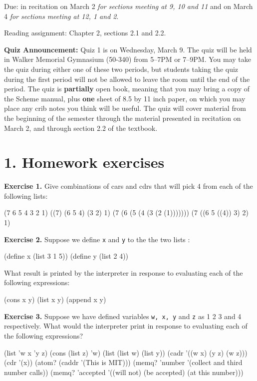 \vpar
Due: in recitation on March 2 {\it for sections meeting at 9, 10 and
11} and on March 4 {\it for sections meeting at 12, 1 and 2}.


\vpar
Reading assignment: Chapter 2, sections 2.1 and 2.2.

\vskip 20pt

{\bf Quiz Announcement:}  Quiz 1 is on Wednesday, March 9.  The quiz
will be held in Walker Memorial Gymnasium (50-340) from 5--7PM or
7--9PM.  You may take the quiz during either one of these two periods,
but students taking the quiz during the first period will not be allowed
to leave the room until the end of the period.  The quiz is {\bf
partially} open book, meaning that you may bring a copy of the Scheme
manual, plus {\bf one} sheet of 8.5 by 11 inch paper, on which you may
place any crib notes you think will be useful.  The quiz will cover
material from the beginning of the semester through the material
presented in recitation on March 2, and through section 2.2 
of the textbook.  

\chapter{1. Homework exercises}


\vpar
{\bf Exercise 1.}
Give combinations of cars and cdrs that will pick 4 from each of
the following lists:

\beginlisp
(7 6 5 4 3 2 1)
((7) (6 5 4) (3 2) 1)
(7 (6 (5 (4 (3 (2 (1)))))))
(7 ((6 5 ((4)) 3) 2) 1)
\endlisp

\vpar
{\bf Exercise 2.}
Suppose we define {\tt x} and {\tt y} to the the two lists :

\beginlisp
(define x (list 3 1 5))
(define y (list 2 4))
\endlisp

\noindent What result is printed by the interpreter in response to
evaluating each of the following expressions:

\beginlisp
(cons x y)
(list x y)
(append x y)
\endlisp

\vpar
{\bf Exercise 3.}
Suppose we have defined variables {\tt w, x, y} and {\tt z} as 1 2 3 and
4 respectively.  What would the interpreter print in response to
evaluating each of the following expressions?

\beginlisp
(list 'w x 'y z)
(cons (list z) 'w)
(list (list w) (list y))
(cadr '((w x) (y z) (w z)))
(cdr '(x))
(atom? (caddr '(This is MIT)))
(memq? 'number '(collect and third number calls))
(memq? 'accepted '((will not) (be accepted) (at this number)))
\endlisp

